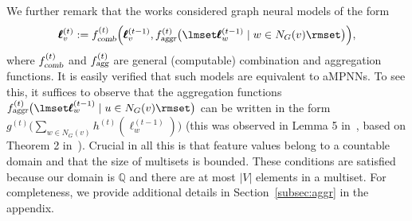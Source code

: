 We further remark that the works \citep{XuHLJ19,grohewl}  considered graph neural models of the form
$$
\pmb{\ell}^{(t)}_{v}:=
f_{\textsl{comb}}^{(t)}\Bigl(
\pmb{\ell}_{v}^{(t-1)},f_{\textsl{aggr}}^{(t)}\bigl(\lmset \pmb{\ell}^{(t-1)}_{w} \mid w \in N_G(v) \rmset\bigr)
\Bigr),
$$
where $f_{\textsl{comb}}^{(t)}$ and  $f_{\textsl{agg}}^{(t)}$ are general (computable) combination and aggregation functions. It is easily verified that such models are equivalent to aMPNNs. To see this, it suffices to observe that the aggregation functions $f_{\textsl{aggr}}^{(t)}\bigl(\lmset \pmb{\ell}^{(t-1)}_{w} \mid u \in N_G(v) \rmset\bigr)$ can be written in the form $g^{(t)}\bigl(\sum_{w\in N_G(v)} h^{(t)}(\pmb{\ell}^{(t-1)}_{w})\bigr)$ (this was observed in Lemma 5 in~\cite{XuHLJ19}, based on Theorem 2 in~\cite{ZaheerKRPSS17}). Crucial in all this is that feature values belong to a countable domain and that the size of multisets is bounded. These conditions are satisfied because our domain is $\mathbb{Q}$ and there are at most $|V|$ elements in a multiset. For completeness, we provide additional details in Section~\ref{subsec:aggr} in the appendix.

